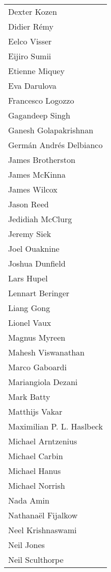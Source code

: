 \begin{tabular}[t]{@{}p{\namewidth}}
Dexter Kozen \\
Didier R\'{e}my \\
Eelco Visser \\
Eijiro Sumii \\
Etienne Miquey \\
Eva Darulova \\
Francesco Logozzo \\
Gagandeep Singh \\
Ganesh Golapakrishnan \\
Germ\'{a}n Andr\'{e}s Delbianco \\
James Brotherston \\
James McKinna \\
James Wilcox \\
Jason Reed \\
Jedidiah McClurg \\
Jeremy Siek \\
Joel Ouaknine \\
Joshua Dunfield \\
Lars Hupel \\
Lennart Beringer \\
Liang Gong \\
Lionel Vaux \\
Magnus Myreen \\
Mahesh Viswanathan \\
Marco Gaboardi \\
Mariangiola Dezani \\
Mark Batty \\
Matthijs Vakar \\
Maximilian P. L. Haslbeck \\
Michael Arntzenius \\
Michael Carbin \\
Michael Hanus \\
Michael Norrish \\
Nada Amin \\
Nathana\"{e}l Fijalkow \\
Neel Krishnaswami \\
Neil Jones \\
Neil Sculthorpe 
\end{tabular}
